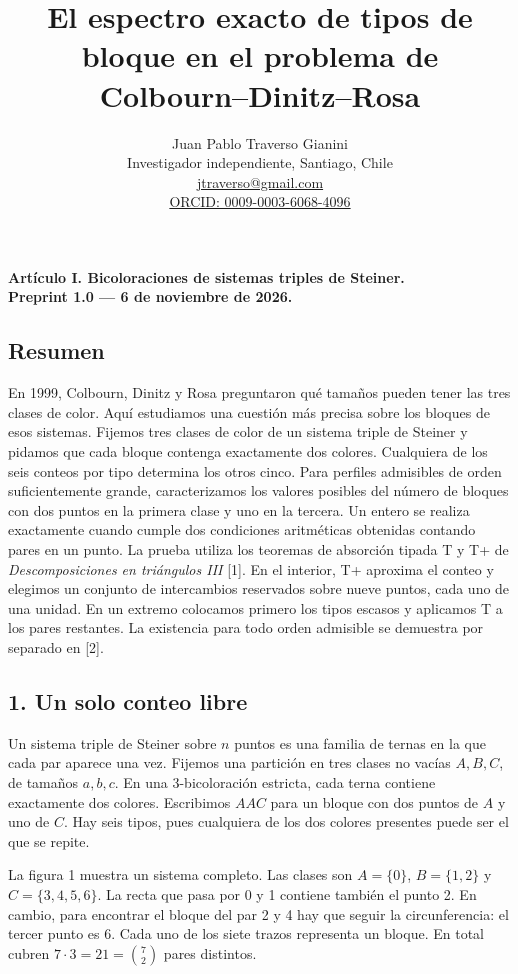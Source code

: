 \documentclass[spanish,11pt,a4paper]{article}
\title{El espectro exacto de tipos de bloque en el problema de Colbourn–Dinitz–Rosa}
\author{Juan Pablo Traverso Gianini\\\small Investigador independiente, Santiago, Chile\\\small \href{mailto:jtraverso@gmail.com}{jtraverso@gmail.com}\\\small \href{https://orcid.org/0009-0003-6068-4096}{ORCID: 0009-0003-6068-4096}}
\date{}
\begin{document}
\raggedbottom
\maketitle
\textbf{Artículo I. Bicoloraciones de sistemas triples de Steiner.}\\\textbf{Preprint 1.0 — 6 de noviembre de 2026.}

\subsection{Resumen}\label{resumen}

En 1999, Colbourn, Dinitz y Rosa preguntaron qué tamaños pueden tener las tres clases de color. Aquí estudiamos una cuestión más precisa sobre los bloques de esos sistemas. Fijemos tres clases de color de un sistema triple de Steiner y pidamos que cada bloque contenga exactamente dos colores. Cualquiera de los seis conteos por tipo determina los otros cinco. Para perfiles admisibles de orden suficientemente grande, caracterizamos los valores posibles del número de bloques con dos puntos en la primera clase y uno en la tercera. Un entero se realiza exactamente cuando cumple dos condiciones aritméticas obtenidas contando pares en un punto. La prueba utiliza los teoremas de absorción tipada T y T+ de \emph{Descomposiciones en triángulos III} {[}1{]}. En el interior, T+ aproxima el conteo y elegimos un conjunto de intercambios reservados sobre nueve puntos, cada uno de una unidad. En un extremo colocamos primero los tipos escasos y aplicamos T a los pares restantes. La existencia para todo orden admisible se demuestra por separado en {[}2{]}.

\subsection{1. Un solo conteo libre}\label{un-solo-conteo-libre}

Un sistema triple de Steiner sobre \(n\) puntos es una familia de ternas en la que cada par aparece una vez. Fijemos una partición en tres clases no vacías \(A,B,C\), de tamaños \(a,b,c\). En una 3-bicoloración estricta, cada terna contiene exactamente dos colores. Escribimos \(AAC\) para un bloque con dos puntos de \(A\) y uno de \(C\). Hay seis tipos, pues cualquiera de los dos colores presentes puede ser el que se repite.

La figura 1 muestra un sistema completo. Las clases son \(A=\{0\}\), \(B=\{1,2\}\) y \(C=\{3,4,5,6\}\). La recta que pasa por 0 y 1 contiene también el punto 2. En cambio, para encontrar el bloque del par 2 y 4 hay que seguir la circunferencia: el tercer punto es 6. Cada uno de los siete trazos representa un bloque. En total cubren \(7\cdot3=21=\binom72\) pares distintos.
\end{document}
